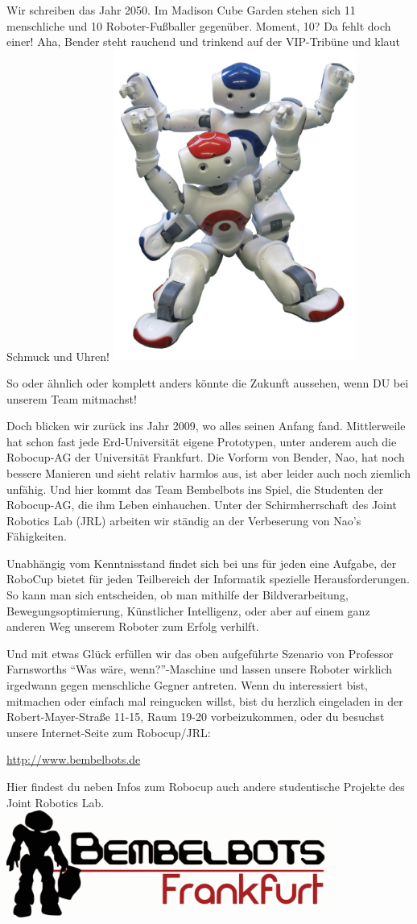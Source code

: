 \spaltenanfang
Wir schreiben das Jahr 2050. Im Madison Cube Garden stehen sich 11 menschliche und 10 Roboter-Fußballer gegenüber. Moment, 10? Da fehlt doch einer! Aha, Bender steht rauchend und trinkend auf der VIP-Tribüne und klaut Schmuck und Uhren!
\includegraphics[width=8cm]{bilder/robocup1}

So oder ähnlich oder komplett anders könnte die Zukunft aussehen, wenn DU bei unserem Team mitmachst!

Doch blicken wir zurück ins Jahr 2009, wo alles seinen Anfang fand. Mittlerweile hat schon fast jede Erd-Universität eigene Prototypen, unter anderem auch die Robocup-AG der Universität Frankfurt. Die Vorform von Bender, Nao, hat noch bessere Manieren und sieht relativ harmlos aus, ist aber leider auch noch ziemlich unfähig. Und hier kommt das Team Bembelbots ins Spiel, die Studenten der Robocup-AG, die ihm Leben einhauchen. Unter der Schirmherrschaft des Joint Robotics Lab (JRL) arbeiten wir ständig an der Verbeserung von Nao's Fähigkeiten.

Unabhängig vom Kenntnisstand findet sich bei uns für jeden eine Aufgabe, der RoboCup bietet für jeden Teilbereich der Informatik spezielle Herausforderungen. So kann man sich entscheiden, ob man mithilfe der Bildverarbeitung, Bewegungsoptimierung, Künstlicher Intelligenz, oder aber auf einem ganz anderen Weg unserem Roboter zum Erfolg verhilft.

Und mit etwas Glück erfüllen wir das oben aufgeführte Szenario von Professor Farnsworths ``Was wäre, wenn?''-Maschine und lassen unsere Roboter wirklich irgedwann gegen menschliche Gegner antreten. Wenn du interessiert bist, mitmachen oder einfach mal reingucken willst, bist du herzlich eingeladen in der Robert-Mayer-Straße 11-15, Raum 19-20 vorbeizukommen, oder du besuchst unsere Internet-Seite zum Robocup/JRL:
 
\url{http://www.bembelbots.de}

Hier findest du neben Infos zum Robocup auch andere studentische Projekte des Joint Robotics Lab. 
\spaltenende
\includegraphics[width=0.8\textwidth]{bilder/Bembelbots}
